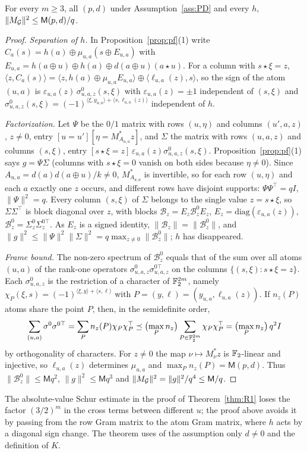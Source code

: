 \begin{theorem}\label{thm:G}
For every $m\ge3$, all $(p,d)$ under Assumption~\ref{ass:PD} and every $h$,
$\|M_{\mathcal{G}}\|^2\le\mathsf M(p,d)/q$.
\end{theorem}
\begin{proof}
\emph{Separation of $h$.} In Proposition~\ref{prop:pf}(1) write $C_a(s)=h(a)\oplus\mu_{u,a}(s\oplus E_{u,a})$ with
$E_{u,a}=h(a\oplus u)\oplus h(a)\oplus d(a\oplus u)(a\star u)$. For a column with $s\star\xi=z$,
$\langle z,C_a(s)\rangle=\langle z,h(a)\oplus\mu_{u,a}E_{u,a}\rangle\oplus\langle\ell_{u,a}(z),s\rangle$, so the sign of the atom $(u,a)$ is
$\varepsilon_{u,a}(z)\,\sigma^0_{u,a,z}(s,\xi)$ with $\varepsilon_{u,a}(z)=\pm1$ independent of $(s,\xi)$ and
$\sigma^0_{u,a,z}(s,\xi)=(-1)^{\langle\xi,y_{u,a}\rangle+\langle s,\ell_{u,a}(z)\rangle}$ independent of $h$.

\emph{Factorization.} Let $\Psi$ be the $0/1$ matrix with rows $(u,\eta)$ and columns $(u',a,z)$, $z\ne0$, entry
$[u=u'][\eta=M^*_{A_{u,a}}z]$, and $\Sigma$ the matrix with rows $(u,a,z)$ and columns $(s,\xi)$, entry
$[s\star\xi=z]\,\varepsilon_{u,a}(z)\sigma^0_{u,a,z}(s,\xi)$. Proposition~\ref{prop:pf}(1) says $g=\Psi\Sigma$ (columns with $s\star\xi=0$ vanish on
both sides because $\eta\ne0$). Since $A_{u,a}=d(a)d(a\oplus u)/k\ne0$, $M^*_{A_{u,a}}$ is invertible, so for each row $(u,\eta)$ and each
$a$ exactly one $z$ occurs, and different rows have disjoint supports: $\Psi\Psi^\top=qI$, $\|\Psi\|^2=q$. Every column $(s,\xi)$ of
$\Sigma$ belongs to the single value $z=s\star\xi$, so $\Sigma\Sigma^\top$ is block diagonal over $z$, with blocks
$\mathcal B_z=E_z\mathcal B^0_zE_z$, $E_z=\mathrm{diag}(\varepsilon_{u,a}(z))$, $\mathcal B^0_z=\Sigma^0_z\Sigma^{0\top}_z$. As $E_z$ is a signed
identity, $\|\mathcal B_z\|=\|\mathcal B^0_z\|$, and $\|g\|^2\le\|\Psi\|^2\|\Sigma\|^2=q\max_{z\ne0}\|\mathcal B^0_z\|$; $h$ has disappeared.

\emph{Frame bound.} The non-zero spectrum of $\mathcal B^0_z$ equals that of the sum over all atoms $(u,a)$ of the rank-one
operators $\sigma^0_{u,a,z}\sigma^{0\top}_{u,a,z}$ on the columns
$\{(s,\xi):s\star\xi=z\}$. Each $\sigma^0_{u,a,z}$ is the restriction of a character of $\mathbb{F}_2^{2m}$, namely
$\chi_P(\xi,s)=(-1)^{\langle\xi,y\rangle+\langle s,\ell\rangle}$ with $P=(y,\ell)=(y_{u,a},\ell_{u,a}(z))$. If $n_z(P)$ atoms share the point $P$, then, in the semidefinite
order,
\[
\sum_{(u,a)}\sigma^0\sigma^{0\top}=\sum_Pn_z(P)\chi_P\chi_P^\top\preceq\bigl(\max_Pn_z\bigr)\sum_{P\in\mathbb{F}_2^{2m}}\chi_P\chi_P^\top
=\bigl(\max_Pn_z\bigr)\,q^2I
\]
by orthogonality of characters. For $z\ne0$ the map $\nu\mapsto M^*_\nu z$ is $\mathbb{F}_2$-linear and injective, so $\ell_{u,a}(z)$ determines $\mu_{u,a}$ and
$\max_Pn_z(P)=\mathsf M(p,d)$. Thus $\|\mathcal B^0_z\|\le\mathsf M q^2$, $\|g\|^2\le\mathsf Mq^3$ and $\|M_{\mathcal{G}}\|^2=\|g\|^2/q^4\le\mathsf M/q$.
\end{proof}
The absolute-value Schur estimate in the proof of Theorem~\ref{thm:R1} loses the factor $(3/2)^m$ in the cross terms between
different $u$; the proof above avoids it by passing from the row Gram matrix to the atom Gram matrix, where $h$ acts by a diagonal
sign change. The theorem uses of the assumption only $d\ne0$ and the definition of $K$.

